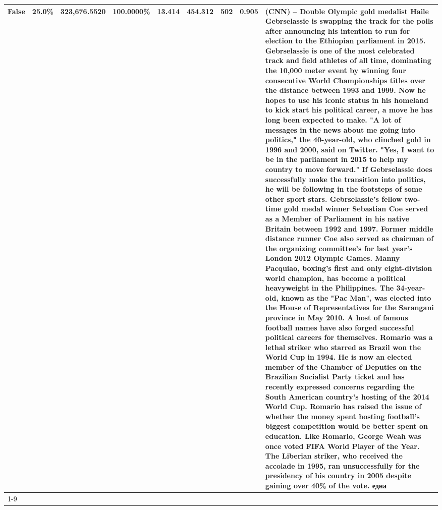 \begin{table}[H]
{\begin{tabular}{lllrlllll}
False & 25.0\% & 323,676.5520 & \bfseries \color{red} 100.0000\% & 13.414 & 454.312 & 502 & 0.905 & (CNN) -- Double Olympic gold medalist Haile Gebrselassie is swapping the track for the polls after announcing his intention to run for election to the Ethiopian parliament in 2015. Gebrselassie is one of the most celebrated track and field athletes of all time, dominating the 10,000 meter event by winning four consecutive World Championships titles over the distance between 1993 and 1999. Now he hopes to use his iconic status in his homeland to kick start his political career, a move he has long been expected to make. "A lot of messages in the news about me going into politics," the 40-year-old, who clinched gold in 1996 and 2000, said on Twitter. "Yes, I want to be in the parliament in 2015 to help my country to move forward." If Gebrselassie does successfully make the transition into politics, he will be following in the footsteps of some other sport stars. Gebrselassie's fellow two-time gold medal winner Sebastian Coe served as a Member of Parliament in his native Britain between 1992 and 1997. Former middle distance runner Coe also served as chairman of the organizing committee's for last year's London 2012 Olympic Games. Manny Pacquiao, boxing's first and only eight-division world champion, has become a political heavyweight in the Philippines. The 34-year-old, known as the "Pac Man", was elected into the House of Representatives for the Sarangani province in May 2010. A host of famous football names have also forged successful political careers for themselves. Romario was a lethal striker who starred as Brazil won the World Cup in 1994. He is now an elected member of the Chamber of Deputies on the Brazilian Socialist Party ticket and has recently expressed concerns regarding the South American country's hosting of the 2014 World Cup. Romario has raised the issue of whether the money spent hosting football's biggest competition would be better spent on education. Like Romario, George Weah was once voted FIFA World Player of the Year. The Liberian striker, who received the accolade in 1995, ran unsuccessfully for the presidency of his country in 2005 despite gaining over 40\% of the vote. една \\
\cline{1-9}

\end{tabular}}
\end{table}
